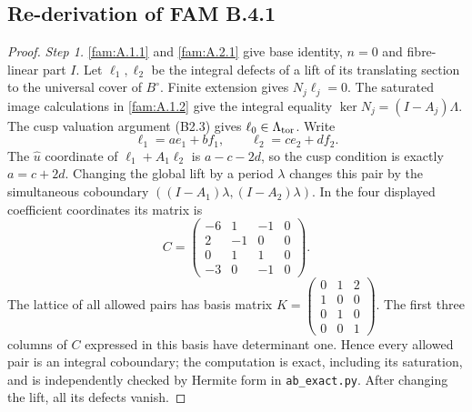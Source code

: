\documentclass[11pt,a4paper]{article}
\theoremstyle{plain}
\theoremstyle{definition}
\begin{document}
\subsection{Re-derivation of FAM B.4.1}
\begin{proof}
\par\noindent\textit{Step 1.} \ref{fam:A.1.1} and \ref{fam:A.2.1} give base identity, $n=0$ and fibre-linear part $I$. Let $\ell_1,\ell_2$ be the integral defects of a lift of its translating section to the universal cover of $B^\circ$. Finite extension gives $N_j\ell_j=0$. The saturated image calculations in \ref{fam:A.1.2} give the integral equality $\ker N_j=(I-A_j)\Lambda$. The cusp valuation argument (B2.3) gives $\ell_0\in\Lambda_{\rm tor}$. Write
\[
 \ell_1=ae_1+bf_1,\qquad \ell_2=ce_2+df_2.
\]
The $\widehat u$ coordinate of $\ell_1+A_1\ell_2$ is $a-c-2d$, so the cusp condition is exactly $a=c+2d$. Changing the global lift by a period $\lambda$ changes this pair by the simultaneous coboundary $((I-A_1)\lambda,(I-A_2)\lambda)$. In the four displayed coefficient coordinates its matrix is
\[
 C=\begin{pmatrix}-6&1&-1&0\\2&-1&0&0\\0&1&1&0\\-3&0&-1&0\end{pmatrix}.
\]
The lattice of all allowed pairs has basis matrix
$K=\left(\begin{smallmatrix}0&1&2\\1&0&0\\0&1&0\\0&0&1\end{smallmatrix}\right)$. The first three columns of $C$ expressed in this basis have determinant one. Hence every allowed pair is an integral coboundary; the computation is exact, including its saturation, and is independently checked by Hermite form in \texttt{ab\_exact.py}. After changing the lift, all its defects vanish.


\end{proof}
\end{document}

